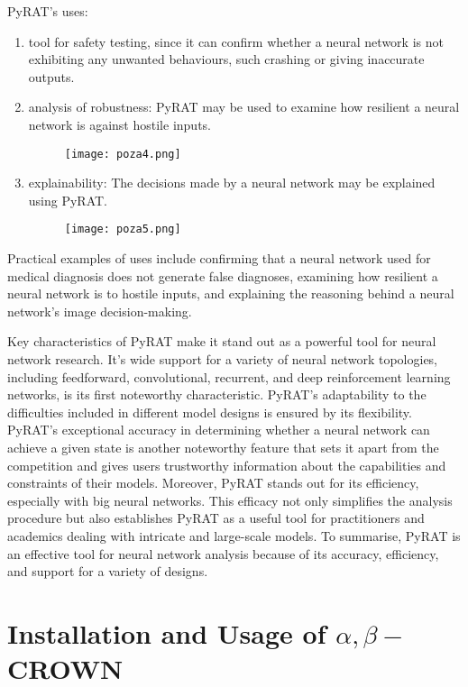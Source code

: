 \documentclass[runningheads]{llncs}
\begin{document}
PyRAT's uses:
\begin{enumerate}
    \item tool for safety testing, since it can confirm whether a neural network is not exhibiting any unwanted behaviours, such crashing or giving inaccurate outputs.
    \item analysis of robustness: PyRAT may be used to examine how resilient a neural network is against hostile inputs.
    \begin{center}
\begin{figure}[h]
\texttt{[image: poza4.png]}
\end{figure}
\end{center}
\item explainability: The decisions made by a neural network may be explained using PyRAT.
\begin{center}
\begin{figure}[h]
\texttt{[image: poza5.png]}
\end{figure}
\end{center}
\end{enumerate}
Practical examples of uses include confirming that a neural network used for medical diagnosis does not generate false diagnoses, examining how resilient a neural network is to hostile inputs, and explaining the reasoning behind a neural network's image decision-making.

Key characteristics of PyRAT make it stand out as a powerful tool for neural network research. It's wide support for a variety of neural network topologies, including feedforward, convolutional, recurrent, and deep reinforcement learning networks, is its first noteworthy characteristic. PyRAT's adaptability to the difficulties included in different model designs is ensured by its flexibility. PyRAT's exceptional accuracy in determining whether a neural network can achieve a given state is another noteworthy feature that sets it apart from the competition and gives users trustworthy information about the capabilities and constraints of their models. Moreover, PyRAT stands out for its efficiency, especially with big neural networks. This efficacy not only simplifies the analysis procedure but also establishes PyRAT as a useful tool for practitioners and academics dealing with intricate and large-scale models. To summarise, PyRAT is an effective tool for neural network analysis because of its accuracy, efficiency, and support for a variety of designs.


\section{Installation and Usage of $\alpha,\beta-$CROWN}
\end{document}
